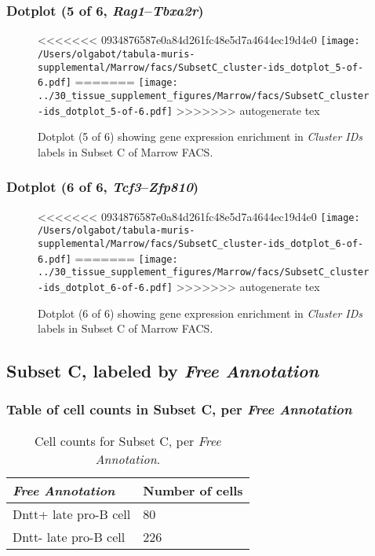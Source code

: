 \clearpage

\subsubsection{Dotplot (5 of 6, \emph{Rag1}--\emph{Tbxa2r})}
\begin{figure}[h]
\centering
<<<<<<< 0934876587e0a84d261fc48e5d7a4644ec19d4e0
\texttt{[image: /Users/olgabot/tabula-muris-supplemental/Marrow/facs/SubsetC\_cluster-ids\_dotplot\_5-of-6.pdf]}
=======
\texttt{[image: ../30\_tissue\_supplement\_figures/Marrow/facs/SubsetC\_cluster-ids\_dotplot\_5-of-6.pdf]}
>>>>>>> autogenerate tex

\caption{ Dotplot (5 of 6)  showing gene expression enrichment in \emph{Cluster IDs} labels in Subset C of Marrow FACS. }
\end{figure}


\clearpage

\subsubsection{Dotplot (6 of 6, \emph{Tcf3}--\emph{Zfp810})}
\begin{figure}[h]
\centering
<<<<<<< 0934876587e0a84d261fc48e5d7a4644ec19d4e0
\texttt{[image: /Users/olgabot/tabula-muris-supplemental/Marrow/facs/SubsetC\_cluster-ids\_dotplot\_6-of-6.pdf]}
=======
\texttt{[image: ../30\_tissue\_supplement\_figures/Marrow/facs/SubsetC\_cluster-ids\_dotplot\_6-of-6.pdf]}
>>>>>>> autogenerate tex

\caption{ Dotplot (6 of 6)  showing gene expression enrichment in \emph{Cluster IDs} labels in Subset C of Marrow FACS. }
\end{figure}


\clearpage

\subsection{Subset C, labeled by \emph{Free Annotation}}
\subsubsection{Table of cell counts in Subset C, per \emph{Free Annotation}}\begin{table}[h]
\centering
\label{my-label}
\begin{tabular}{@{}ll@{}}
\toprule

\emph{Free Annotation}& Number of cells \\ \midrule
Dntt+ late pro-B cell & 80 \\

Dntt- late pro-B cell & 226 \\
\bottomrule
\end{tabular}
\caption{Cell counts for Subset C, per \emph{Free Annotation}.}
\end{table}

